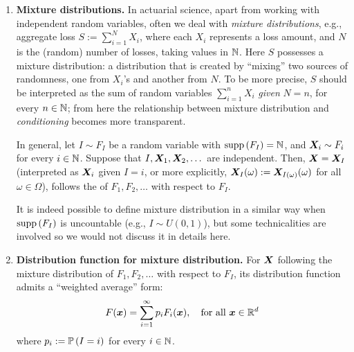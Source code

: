 \begin{enumerate}
\item \textbf{Mixture distributions.} In actuarial science, apart from working
with independent random variables, often we deal with \emph{mixture
distributions}, e.g., aggregate loss \(S:=\sum_{i=1}^{N}X_i\), where each
\(X_i\) represents a loss amount, and \(N\) is the (random) number of losses, taking
values in \(\mathbb{N}\). Here \(S\) possesses a mixture distribution: a distribution
that is created by ``mixing'' two sources of randomness, one from \(X_i\)'s and
another from \(N\).  To be more precise, \(S\) should be interpreted as the sum
of random variables \(\sum_{i=1}^{n}X_i\) \emph{given} \(N=n\), for every \(n\in\mathbb{N}\);
from here the relationship between mixture distribution and \emph{conditioning}
becomes more transparent.

In general, let \(I\sim F_I\) be a random variable with \(\operatorname{supp}\left(F_I\right)=\mathbb{N}\), and
\(\bm{X}_i\sim F_i\) for every \(i\in\mathbb{N}\). Suppose that
\(I,\bm{X}_1,\bm{X}_2,\dotsc\) are independent. Then,
\(\bm{X}=\bm{X}_{I}\) (interpreted as \(\bm{X}_i\) given \(I=i\), or more
explicitly, \(\bm{X}_{I}(\omega):=\bm{X}_{I(\omega)}(\omega)\) for all
\(\omega\in\Omega\)), follows the  of
\(F_1,F_2,\dotsc\) with respect to \(F_{I}\).

\begin{note}
It is indeed possible to define mixture distribution in a similar way when
\(\operatorname{supp}\left(F_I\right)\) is uncountable (e.g., \(I\sim U(0,1)\)), but some technicalities
are involved so we would not discuss it in details here.
\end{note}

\item\label{it:mixture-df} \textbf{Distribution function for mixture distribution.}
For \(\bm{X}\) following the mixture distribution of \(F_1,F_2,\dotsc\) with
respect to \(F_{I}\), its distribution function admits a ``weighted average''
form:
\[
F(\bm{x})=\sum_{i=1}^{\infty}p_iF_i(\bm{x}),\quad\text{for all \(\bm{x}\in\mathbb{R}^d\)}
\]
where \(p_i:=\mathbb{P}\left(I=i\right)\) for every \(i\in\mathbb{N}\).


\end{enumerate}
